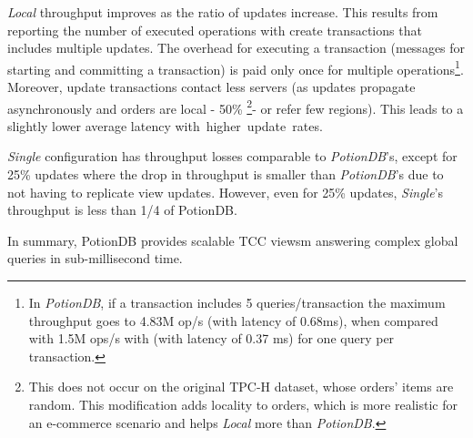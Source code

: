 \documentclass[sigplan,twocolumn,review,anonymous]{acmart}
\begin{document}
\textit{Local} throughput improves as the ratio of updates increase. This results from reporting
the number of executed operations with create transactions that includes multiple updates. 
The overhead for executing a transaction (messages for starting and committing a transaction) is paid
only once for multiple operations\footnote{In \textit{PotionDB}, if a transaction includes 5 queries/transaction the maximum throughput 
goes to 4.83M op/s (with latency of 0.68ms), when compared with 1.5M ops/s with (with latency of 0.37 ms) for one query per transaction.}.  
Moreover, update transactions contact less servers (as updates propagate asynchronously and 
orders are local - 50\% \footnote{This does not occur on the original TPC-H dataset, 
whose orders' items are random. This modification adds locality to orders, which is more realistic for 
an e-commerce scenario and helps \textit{Local} more than \textit{PotionDB}.}- or refer few regions). 
This leads to a slightly lower average latency \mbox{with higher update rates.}

\textit{Single} configuration has throughput losses comparable to \textit{PotionDB}'s, except for 25\% updates where the drop in throughput is smaller 
than \textit{PotionDB}'s due to not having to replicate view updates.
However, even for 25\% updates, \textit{Single}'s throughput is less than 1/4 of PotionDB.

In summary, %
PotionDB provides scalable TCC viewsm answering complex global queries in sub-millisecond time.
\end{document}
